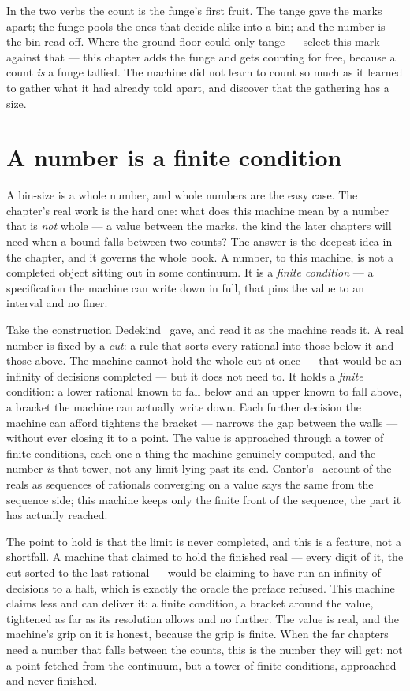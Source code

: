 In the two verbs the count is the funge's first fruit. The tange gave the marks apart; the funge pools the ones that
decide alike into a bin; and the number is the bin read off. Where the ground floor could only tange --- select this
mark against that --- this chapter adds the funge and gets counting for free, because a count \emph{is} a funge
tallied. The machine did not learn to count so much as it learned to gather what it had already told apart, and discover
that the gathering has a size.

\section{A number is a finite condition}

A bin-size is a whole number, and whole numbers are the easy case. The chapter's real work is the hard one: what does
this machine mean by a number that is \emph{not} whole --- a value between the marks, the kind the later chapters will
need when a bound falls between two counts? The answer is the deepest idea in the chapter, and it governs the whole
book. A number, to this machine, is not a completed object sitting out in some continuum. It is a \emph{finite
condition} --- a specification the machine can write down in full, that pins the value to an interval and no finer.

Take the construction Dedekind~\cite{dedekind1872} gave, and read it as the machine reads it. A real number is fixed by
a \emph{cut}: a rule that sorts every rational into those below it and those above. The machine cannot hold the whole
cut at once --- that would be an infinity of decisions completed --- but it does not need to. It holds a \emph{finite}
condition: a lower rational known to fall below and an upper known to fall above, a bracket the machine can actually
write down. Each further decision the machine can afford tightens the bracket --- narrows the gap between the walls ---
without ever closing it to a point. The value is approached through a tower of finite conditions, each one a thing the
machine genuinely computed, and the number \emph{is} that tower, not any limit lying past its end. Cantor's~\cite{cantor1872} account of the reals as sequences of rationals converging on a value says the same from the sequence side; this
machine keeps only the finite front of the sequence, the part it has actually reached.

The point to hold is that the limit is never completed, and this is a feature, not a shortfall. A machine that claimed
to hold the finished real --- every digit of it, the cut sorted to the last rational --- would be claiming to have run
an infinity of decisions to a halt, which is exactly the oracle the preface refused. This machine claims less and can
deliver it: a finite condition, a bracket around the value, tightened as far as its resolution allows and no further.
The value is real, and the machine's grip on it is honest, because the grip is finite. When the far chapters need a
number that falls between the counts, this is the number they will get: not a point fetched from the continuum, but a
tower of finite conditions, approached and never finished.

